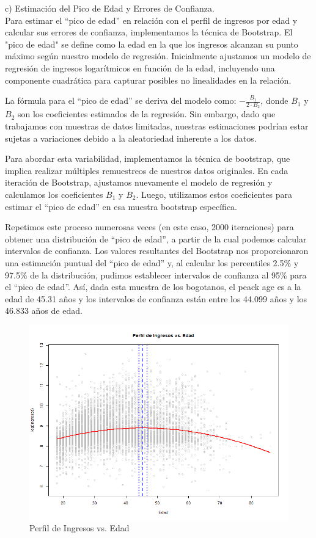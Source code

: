 c) Estimación del Pico de Edad y Errores de Confianza.\\

Para estimar el ``pico de edad'' en relación con el perfil de ingresos por edad y calcular sus errores de confianza, implementamos la técnica de Bootstrap. El "pico de edad" se define como la edad en la que los ingresos alcanzan su punto máximo según nuestro modelo de regresión. Inicialmente ajustamos un modelo de regresión de ingresos logarítmicos en función de la edad, incluyendo una componente cuadrática para capturar posibles no linealidades en la relación.

La fórmula para el ``pico de edad'' se deriva del modelo como: $-\frac{B_1}{2 \cdot B_2}$, donde $B_1$ y $B_2$ son los coeficientes estimados de la regresión. Sin embargo, dado que trabajamos con muestras de datos limitadas, nuestras estimaciones podrían estar sujetas a variaciones debido a la aleatoriedad inherente a los datos.

Para abordar esta variabilidad, implementamos la técnica de bootstrap, que implica realizar múltiples remuestreos de nuestros datos originales. En cada iteración de Bootstrap, ajustamos nuevamente el modelo de regresión y calculamos los coeficientes $B_1$ y $B_2$. Luego, utilizamos estos coeficientes para estimar el ``pico de edad'' en esa muestra bootstrap específica.

Repetimos este proceso numerosas veces (en este caso, 2000 iteraciones) para obtener una distribución de ``pico de edad'', a partir de la cual podemos calcular intervalos de confianza. Los valores resultantes del Bootstrap nos proporcionaron una estimación puntual del ``pico de edad'' y, al calcular los percentiles 2.5\% y 97.5\% de la distribución, pudimos establecer intervalos de confianza al 95\% para el ``pico de edad''. Así, dada esta muestra de los bogotanos, el peack age es a la edad de 45.31 años y los intervalos de confianza están entre los 44.099 años y los 46.833 años de edad.


\begin{figure}[ht]
  \centering
  \includegraphics[width=1.1\textwidth]{Imagenes/perfil_ingresos_vs_edad.png}
  \caption{Perfil de Ingresos vs. Edad}
  \label{fig:perfil_ingresos}
\end{figure}

